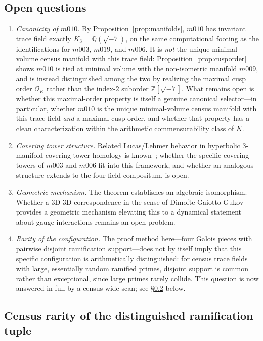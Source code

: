 \documentclass[12pt]{amsart}
\newcommand{\Q}{\mathbb{Q}}
\newcommand{\Z}{\mathbb{Z}}
\begin{document}
\subsection{Open questions}
\begin{enumerate}
\item \textit{Canonicity of $m010$.} By Proposition~\ref{prop:manifolds},
  $m010$ has invariant trace field exactly $K_3=\Q(\sqrt{-7})$, on the
  same computational footing as the identifications for $m003$, $m019$,
  and $m006$. It is \emph{not} the unique minimal-volume census manifold
  with this trace field: Proposition~\ref{prop:cusporder} shows $m010$ is
  tied at minimal volume with the non-isometric manifold $m009$, and is
  instead distinguished among the two by realizing the maximal cusp order
  $\mathcal{O}_K$ rather than the index-$2$ suborder $\Z[\sqrt{-7}]$. What
  remains open is whether this maximal-order property is itself a genuine
  canonical selector---in particular, whether $m010$ is the unique
  minimal-volume census manifold with this trace field \emph{and} a
  maximal cusp order, and whether that property has a clean
  characterization within the arithmetic commensurability class of $K$.
\item \textit{Covering tower structure.} Related Lucas/Lehmer behavior in
  hyperbolic 3-manifold covering-tower homology is known~\cite{MR97};
  whether the specific covering towers of $m003$ and $m006$ fit into
  this framework, and whether an analogous structure extends to the
  four-field compositum, is open.
\item \textit{Geometric mechanism.} The theorem establishes an algebraic
  isomorphism. Whether a 3D-3D correspondence in the sense of
  Dimofte-Gaiotto-Gukov~\cite{DGG} provides a geometric mechanism
  elevating this to a dynamical statement about gauge interactions
  remains an open problem.
\item \textit{Rarity of the configuration.} The proof method here---four
  Galois pieces with pairwise disjoint ramification support---does not
  by itself imply that this specific configuration is arithmetically
  distinguished: for census trace fields with large, essentially random
  ramified primes, disjoint support is common rather than exceptional,
  since large primes rarely collide. This question is now answered in
  full by a census-wide scan; see
  \S\ref{sub:census-rarity} below.
\end{enumerate}

\subsection{Census rarity of the distinguished ramification
tuple}\label{sub:census-rarity}
\end{document}
